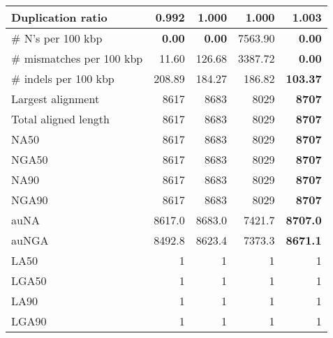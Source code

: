 \documentclass[12pt,a4paper]{article}
\begin{document}
\begin{table}[ht]
\begin{center}
\begin{tabular}{|l*{4}{|r}|}
Duplication ratio & {\bf 0.992} & 1.000 & 1.000 & 1.003 \\ \hline
\# N's per 100 kbp & {\bf 0.00} & {\bf 0.00} & 7563.90 & {\bf 0.00} \\ \hline
\# mismatches per 100 kbp & 11.60 & 126.68 & 3387.72 & {\bf 0.00} \\ \hline
\# indels per 100 kbp & 208.89 & 184.27 & 186.82 & {\bf 103.37} \\ \hline
Largest alignment & 8617 & 8683 & 8029 & {\bf 8707} \\ \hline
Total aligned length & 8617 & 8683 & 8029 & {\bf 8707} \\ \hline
NA50 & 8617 & 8683 & 8029 & {\bf 8707} \\ \hline
NGA50 & 8617 & 8683 & 8029 & {\bf 8707} \\ \hline
NA90 & 8617 & 8683 & 8029 & {\bf 8707} \\ \hline
NGA90 & 8617 & 8683 & 8029 & {\bf 8707} \\ \hline
auNA & 8617.0 & 8683.0 & 7421.7 & {\bf 8707.0} \\ \hline
auNGA & 8492.8 & 8623.4 & 7373.3 & {\bf 8671.1} \\ \hline
LA50 & 1 & 1 & 1 & 1 \\ \hline
LGA50 & 1 & 1 & 1 & 1 \\ \hline
LA90 & 1 & 1 & 1 & 1 \\ \hline
LGA90 & 1 & 1 & 1 & 1 \\ \hline
\end{tabular}
\end{center}
\end{table}
\end{document}
